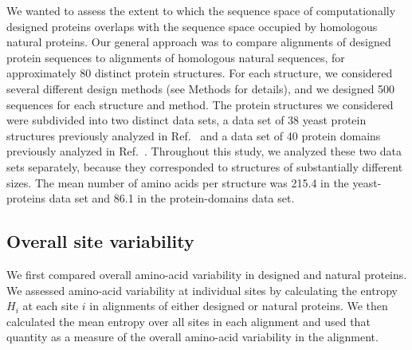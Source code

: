 \documentclass[12pt]{article}
\begin{document}
We wanted to assess the extent to which the sequence space of computationally designed proteins overlaps with the sequence space occupied by homologous natural proteins. Our general approach was to compare alignments of designed protein sequences to alignments of homologous natural sequences, for approximately 80 distinct protein structures. For each structure, we considered several different design methods (see Methods for details), and we designed 500 sequences for each structure and method. The protein structures we considered were subdivided into two distinct data sets, a data set of 38 yeast protein structures previously analyzed in Ref.\ \cite{Ramsey2011} and a data set of 40 protein domains previously analyzed in  Ref.\ \cite{OllikainenKortemme}. Throughout this study, we analyzed these two data sets separately, because they corresponded to structures of substantially different sizes. The mean number of amino acids per structure was 215.4 in the yeast-proteins data set and 86.1 in the protein-domains data set.

\subsection{Overall site variability}
\label{SiteVariability}

We first compared overall amino-acid variability in designed and natural proteins. We assessed amino-acid variability at individual sites by calculating the entropy $H_i$ at each site $i$ in alignments of either designed or natural proteins. We then calculated the mean entropy over all sites in each alignment and used that quantity as a measure of the overall amino-acid variability in the alignment.
\end{document}
